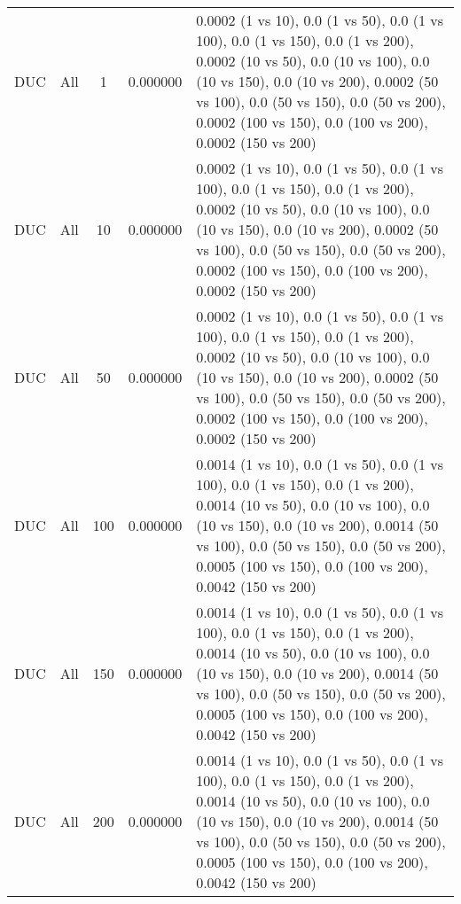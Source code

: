 \begin{tabular}{|l|c|c|c|p{7cm}|}
DUC & All & 1 & 0.000000 & 0.0002 (1 vs 10), 0.0 (1 vs 50), 0.0 (1 vs 100), 0.0 (1 vs 150), 0.0 (1 vs 200), 0.0002 (10 vs 50), 0.0 (10 vs 100), 0.0 (10 vs 150), 0.0 (10 vs 200), 0.0002 (50 vs 100), 0.0 (50 vs 150), 0.0 (50 vs 200), 0.0002 (100 vs 150), 0.0 (100 vs 200), 0.0002 (150 vs 200) \\
DUC & All & 10 & 0.000000 & 0.0002 (1 vs 10), 0.0 (1 vs 50), 0.0 (1 vs 100), 0.0 (1 vs 150), 0.0 (1 vs 200), 0.0002 (10 vs 50), 0.0 (10 vs 100), 0.0 (10 vs 150), 0.0 (10 vs 200), 0.0002 (50 vs 100), 0.0 (50 vs 150), 0.0 (50 vs 200), 0.0002 (100 vs 150), 0.0 (100 vs 200), 0.0002 (150 vs 200) \\
DUC & All & 50 & 0.000000 & 0.0002 (1 vs 10), 0.0 (1 vs 50), 0.0 (1 vs 100), 0.0 (1 vs 150), 0.0 (1 vs 200), 0.0002 (10 vs 50), 0.0 (10 vs 100), 0.0 (10 vs 150), 0.0 (10 vs 200), 0.0002 (50 vs 100), 0.0 (50 vs 150), 0.0 (50 vs 200), 0.0002 (100 vs 150), 0.0 (100 vs 200), 0.0002 (150 vs 200) \\
DUC & All & 100 & 0.000000 & 0.0014 (1 vs 10), 0.0 (1 vs 50), 0.0 (1 vs 100), 0.0 (1 vs 150), 0.0 (1 vs 200), 0.0014 (10 vs 50), 0.0 (10 vs 100), 0.0 (10 vs 150), 0.0 (10 vs 200), 0.0014 (50 vs 100), 0.0 (50 vs 150), 0.0 (50 vs 200), 0.0005 (100 vs 150), 0.0 (100 vs 200), 0.0042 (150 vs 200) \\
DUC & All & 150 & 0.000000 & 0.0014 (1 vs 10), 0.0 (1 vs 50), 0.0 (1 vs 100), 0.0 (1 vs 150), 0.0 (1 vs 200), 0.0014 (10 vs 50), 0.0 (10 vs 100), 0.0 (10 vs 150), 0.0 (10 vs 200), 0.0014 (50 vs 100), 0.0 (50 vs 150), 0.0 (50 vs 200), 0.0005 (100 vs 150), 0.0 (100 vs 200), 0.0042 (150 vs 200) \\
DUC & All & 200 & 0.000000 & 0.0014 (1 vs 10), 0.0 (1 vs 50), 0.0 (1 vs 100), 0.0 (1 vs 150), 0.0 (1 vs 200), 0.0014 (10 vs 50), 0.0 (10 vs 100), 0.0 (10 vs 150), 0.0 (10 vs 200), 0.0014 (50 vs 100), 0.0 (50 vs 150), 0.0 (50 vs 200), 0.0005 (100 vs 150), 0.0 (100 vs 200), 0.0042 (150 vs 200) \\
\bottomrule
\end{tabular}
